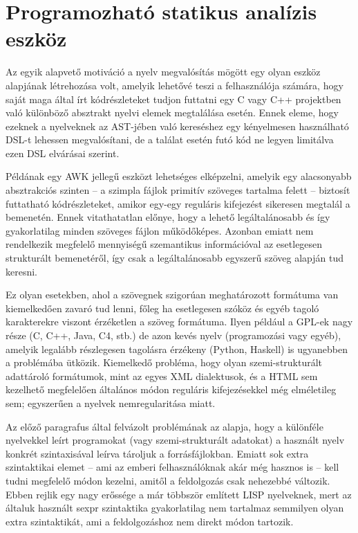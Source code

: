 \section{Programozható statikus analízis eszköz}\label{sec:ftr:blast}

Az egyik alapvető motiváció a nyelv megvalósítás mögött egy olyan eszköz alapjának létrehozása volt, amelyik lehetővé teszi a felhasználója számára, hogy saját maga által írt kódrészleteket tudjon futtatni egy C vagy C++ projektben való különböző absztrakt nyelvi elemek megtalálása esetén.
Ennek eleme, hogy ezeknek a nyelveknek az \gls{AST}-jében való kereséshez egy kényelmesen használható \gls{DSL}-t lehessen megvalósítani, de a találat esetén futó kód ne legyen limitálva ezen \gls{DSL} elvárásai szerint.

Példának egy AWK jellegű eszközt lehetséges elképzelni, amelyik egy alacsonyabb absztrakciós szinten -- a szimpla fájlok primitív szöveges tartalma felett -- biztosít futtatható kódrészleteket, amikor egy-egy reguláris kifejezést sikeresen megtalál a bemenetén.
Ennek vitathatatlan előnye, hogy a lehető legáltalánosabb és így gyakorlatilag minden szöveges fájlon működőképes.
Azonban emiatt nem rendelkezik megfelelő mennyiségű szemantikus információval az esetlegesen strukturált bemenetéről, így csak a legáltalánosabb egyszerű szöveg alapján tud keresni.

Ez olyan esetekben, ahol a szövegnek szigorúan meghatározott formátuma van kiemelkedően zavaró tud lenni, főleg ha esetlegesen szóköz és egyéb tagoló karakterekre viszont érzéketlen a szöveg formátuma.
Ilyen például a \gls{GPL}-ek nagy része (\pl C, C++, Java, C4, stb.) de azon kevés nyelv (programozási vagy egyéb), amelyik legalább részlegesen tagolásra érzékeny (\pl Python, Haskell) is ugyanebben a problémába ütközik.
Kiemelkedő probléma, hogy olyan szemi-strukturált adattároló formátumok, mint az egyes \gls{XML} dialektusok, és a \gls{HTML} sem kezelhető megfelelően általános módon reguláris kifejezésekkel még elméletileg sem; egyszerűen a nyelvek nemregularitása miatt.

Az előző paragrafus által felvázolt problémának az alapja, hogy a különféle nyelvekkel leírt programokat (vagy szemi-strukturált adatokat) a használt nyelv konkrét szintaxisával leírva tároljuk a forrásfájlokban.
Emiatt sok extra szintaktikai elemet -- ami az emberi felhasználóknak akár még hasznos is -- kell tudni megfelelő módon kezelni, amitől a feldolgozás csak nehezebbé változik.
Ebben rejlik egy nagy erőssége a már többször említett LISP nyelveknek, mert az általuk használt \gls{sexpr} szintaktika gyakorlatilag nem tartalmaz semmilyen olyan extra szintaktikát, ami a feldolgozáshoz nem direkt módon tartozik.

